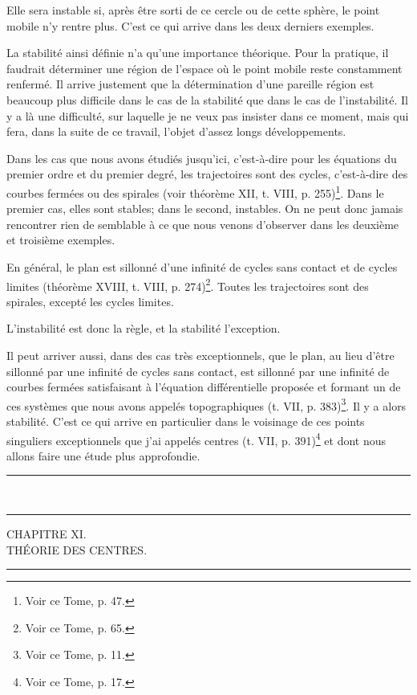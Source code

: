 \documentclass[11pt]{article}
\newcommand{\ornament}{\begin{center}\rule{2.5em}{0.4pt}\,\raisebox{0.1ex}{\tiny$\bullet\bullet\bullet$}\,\rule{2.5em}{0.4pt}\end{center}}
\newcommand{\shortline}{\begin{center}\rule{3.5em}{0.4pt}\end{center}}
\begin{document}
Elle sera instable si, après être sorti de ce cercle ou de cette sphère, le point mobile n’y rentre plus. C’est ce qui arrive dans les deux derniers exemples.

La stabilité ainsi définie n’a qu’une importance théorique. Pour la pratique, il faudrait déterminer une région de l’espace où le point mobile reste constamment renfermé. Il arrive justement que la détermination d’une pareille région est beaucoup plus difficile dans le cas de la stabilité que dans le cas de l’instabilité. Il y a là une difficulté, sur laquelle je ne veux pas insister dans ce moment, mais qui fera, dans la suite de ce travail, l’objet d’assez longs développements.

Dans les cas que nous avons étudiés jusqu’ici, c’est-à-dire pour les équations du premier ordre et du premier degré, les trajectoires sont des cycles, c’est-à-dire des courbes fermées ou des spirales (voir théorème XII, t. VIII, p. 255)\footnote{Voir ce Tome, p. 47.}. Dans le premier cas, elles sont stables; dans le second, instables. On ne peut donc jamais rencontrer rien de semblable à ce que nous venons d’observer dans les deuxième et troisième exemples.

En général, le plan est sillonné d’une infinité de cycles sans contact et de cycles limites (théorème XVIII, t. VIII, p. 274)\footnote{Voir ce Tome, p. 65.}. Toutes les trajectoires sont des spirales, excepté les cycles limites.

L’instabilité est donc la règle, et la stabilité l’exception.

Il peut arriver aussi, dans des cas très exceptionnels, que le plan, au lieu d’être sillonné par une infinité de cycles sans contact, est sillonné par une infinité de courbes fermées satisfaisant à l’équation différentielle proposée et formant un de ces systèmes que nous avons appelés topographiques (t. VII, p. 383)\footnote{Voir ce Tome, p. 11.}. Il y a alors stabilité. C’est ce qui arrive en particulier dans le voisinage de ces points singuliers exceptionnels que j’ai appelés centres (t. VII, p. 391)\footnote{Voir ce Tome, p. 17.} et dont nous allons faire une étude plus approfondie.

\ornament

\begin{center}
{\large CHAPITRE XI.}\\[0.4em]
{\small THÉORIE DES CENTRES.}
\end{center}
\shortline
\end{document}
